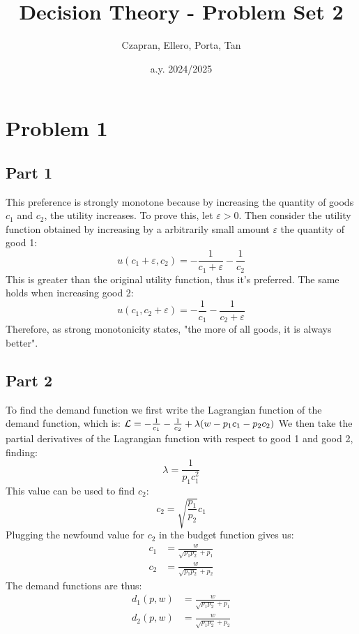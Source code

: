\documentclass[12pt]{extarticle}
\title{Decision Theory - Problem Set 2}
\author{Czapran, Ellero, Porta, Tan}
\date{a.y. 2024/2025}
\numberwithin{table}{section}
\numberwithin{figure}{section}
\numberwithin{equation}{section}
\begin{document}
\maketitle

\section*{Problem 1}

\subsection*{Part 1}
This preference is strongly monotone because by increasing the quantity of goods $c_1$ and $c_2$, the utility increases.
To prove this, let $\varepsilon>0$.
Then consider the utility function obtained by increasing
by a arbitrarily small amount $\varepsilon$ the quantity of good 1:
\begin{equation}
    u(c_1 + \varepsilon,c_2)=-\frac{1}{c_1+\varepsilon}-\frac{1}{c_2}
\end{equation}
This is greater than the original utility function, thus it's preferred. The same holds when increasing good 2:
\begin{equation}
    u(c_1,c_2 + \varepsilon)=-\frac{1}{c_1}-\frac{1}{c_2 + \varepsilon}
\end{equation}
Therefore, as strong monotonicity states, "the more of all goods, it is always better".

\subsection*{Part 2}
To find the demand function we first write the Lagrangian function of the demand function,
which is: ${\cal L}= -\frac{1}{c_1}-\frac{1}{c_2}+ \lambda(w-p_1c_1-p_2c_2)$
We then take the partial derivatives of the Lagrangian function with respect to good 1 and good 2, finding:
\begin{equation}
    \lambda= \frac{1}{p_1c_1^2}
\end{equation}
This value can be used to find $c_2$:
\begin{equation}
    c_2=\sqrt{\frac{p_1}{p_2}}c_1
\end{equation}
Plugging the newfound value for $c_2$ in the budget function gives us:
\begin{align}
    c_1 & = \frac{w}{\sqrt{p_1p_2}+p_1} \\
    c_2 & = \frac{w}{\sqrt{p_1p_2}+p_2}
\end{align}
The demand functions are thus:
\begin{align}
    d_1(p,w) & = \frac{w}{\sqrt{p_1p_2}+p_1} \\
    d_2(p,w) & = \frac{w}{\sqrt{p_1p_2}+p_2}
\end{align}
\end{document}
